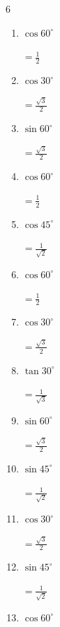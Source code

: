 \begin{multicols}{6}
\begin{enumerate}
        $\displaystyle =\frac{\sqrt{3}}{2}$

  \item $\displaystyle \cos{60^\circ}$

        $\displaystyle =\frac{1}{2}$

  \item $\displaystyle \cos{30^\circ}$

        $\displaystyle =\frac{\sqrt{3}}{2}$

  \item $\displaystyle \sin{60^\circ}$

        $\displaystyle =\frac{\sqrt{3}}{2}$

  \item $\displaystyle \cos{60^\circ}$

        $\displaystyle =\frac{1}{2}$

\columnbreak %

  \item $\displaystyle \cos{45^\circ}$

        $\displaystyle =\frac{1}{\sqrt{2}}$

  \item $\displaystyle \cos{60^\circ}$

        $\displaystyle =\frac{1}{2}$

  \item $\displaystyle \cos{30^\circ}$

        $\displaystyle =\frac{\sqrt{3}}{2}$

  \item $\displaystyle \tan{30^\circ}$

        $\displaystyle =\frac{1}{\sqrt{3}}$

  \item $\displaystyle \sin{60^\circ}$

        $\displaystyle =\frac{\sqrt{3}}{2}$

  \item $\displaystyle \sin{45^\circ}$

        $\displaystyle =\frac{1}{\sqrt{2}}$

  \item $\displaystyle \cos{30^\circ}$

        $\displaystyle =\frac{\sqrt{3}}{2}$

  \item $\displaystyle \sin{45^\circ}$

        $\displaystyle =\frac{1}{\sqrt{2}}$

  \item $\displaystyle \cos{60^\circ}$


\end{enumerate}
\end{multicols}
